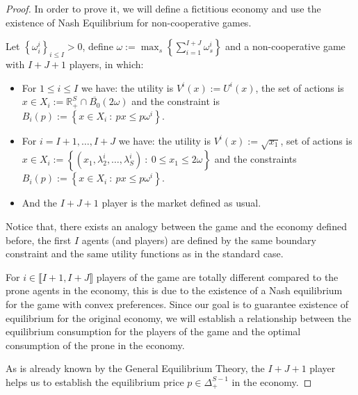 \documentclass[pdftex]{article}
\numberwithin{equation}{section}
\theoremstyle{th}
\newtheorem{proof lemma}{{Proof Lemma}.}
\theoremstyle{definition}
\newtheorem*{risk lovers}{Risk lovers}
\newtheorem*{risk averse}{Risk averse}
\begin{document}
{\begin{proof}
In order to prove it, we will define a fictitious economy and use the existence of Nash Equilibrium for non-cooperative games.

Let $\left\{\omega_i^i\right\}_{i\leq{I}}>0$, define $\omega:=\max_s\left\{\sum_{i=1}^{I+J}\omega_s^i\right\}$ and a non-cooperative game with $I+J+1$ players, in which:
\begin{itemize}
\item For $1\leq{i}\leq{I}$ we have: the utility is $V^i(x):={U}^i(x)$, the set of actions is $x\in{X_i}:=\mathbb{R}_+^S\cap\overline{B_0}(2\omega)$ and the constraint is $B_i(p):=\left\{x\in{X_i}\ :\ px\leq{p\omega^i}\right\}$.

\item For $i=I+1,\dots,I+J$ we have: the utility is $V^i(x):=\sqrt{x_1}$, set of actions is $x\in{X_i}:=\left\{\left(x_1,\lambda_2^i,\dots,\lambda_S^i\right)\ :\ 0\leq{x}_1\leq2\omega\right\}$ and the constraints $B_i(p):=\left\{x\in{X_i}\ :\ px\leq{p\omega^i}\right\}$.

\item And the $I+J+1$ player is the market defined as usual.
\end{itemize}

Notice that, there exists an analogy between the game and the economy defined before, the first $I$ agents (and players) are defined by the same boundary constraint and the same utility functions as in the standard case.

For $i\in\llbracket{I}+1,I+J\rrbracket$ players of the game are totally different compared to the prone agents in the economy, this is due to the existence of a Nash equilibrium for the game with convex preferences. Since our goal is to guarantee existence of equilibrium for the original economy, we will establish a relationship between the equilibrium consumption for the players of the game and the optimal consumption of the prone in the economy.

As is already known by the General Equilibrium Theory,  the $I+J+1$ player helps us to establish the equilibrium price $p\in\Delta_+^{S-1}$ in the economy.


\end{proof}}
\end{document}
